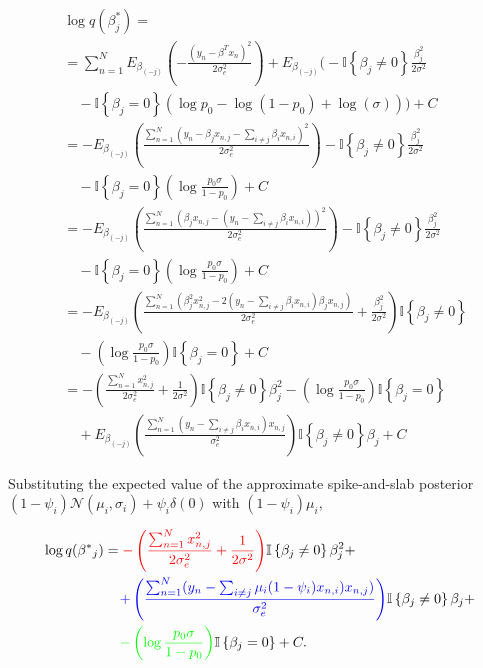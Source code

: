 \begin{align}
    &\log q(\beta^{*}_j) = \nonumber \\
    &= \sum_{n=1}^N E_{\beta_{(-j)}} \left( - \frac{(y_n - \beta^T x_n)^2}{2 \sigma_e^2} \right) + E_{\beta_{(-j)}} \bigg( - \mathbb{I}\left\{\beta_j \ne 0\right\} \frac{\beta_j^2}{2\sigma^2} \nonumber \\
    &\quad - \mathbb{I}\left\{\beta_j = 0\right\} \left(\log p_0 - \log (1-p_0) + \log(\sigma) \right)\bigg) + C \nonumber \\
    &= - E_{\beta_{(-j)}} \left( \frac{\sum_{n=1}^N (y_n - \beta_j x_{n,j} - \sum_{i \ne j} \beta_i x_{n,i})^2}{2 \sigma_e^2} \right)  - \mathbb{I}\left\{\beta_j \ne 0\right\} \frac{\beta_j^2}{2\sigma^2} \nonumber \\
    &\quad - \mathbb{I}\left\{\beta_j = 0\right\} \left(\log \frac{p_0 \sigma}{1-p_0} \right) + C \nonumber \\
    &= - E_{\beta_{(-j)}} \left( \frac{\sum_{n=1}^N (\beta_j x_{n,j} - (y_n - \sum_{i \ne j} \beta_i x_{n,i}))^2}{2 \sigma_e^2} \right)  - \mathbb{I}\left\{\beta_j \ne 0\right\} \frac{\beta_j^2}{2\sigma^2} \nonumber \\
    &\quad - \mathbb{I}\left\{\beta_j = 0\right\} \left(\log \frac{p_0 \sigma}{1-p_0} \right) + C \nonumber \\
    &= - E_{\beta_{(-j)}} \left( \frac{\sum_{n=1}^N (\beta^2_j x^2_{n,j} - 2(y_n - \sum_{i \ne j} \beta_i x_{n,i})\beta_j x_{n,j})}{2 \sigma_e^2} + \frac{\beta_j^2}{2\sigma^2} \right) \mathbb{I}\left\{\beta_j \ne 0\right\} \nonumber \\
    &\quad - \left(\log \frac{p_0 \sigma}{1-p_0} \right)\mathbb{I}\left\{\beta_j = 0\right\} + C \nonumber \\
    &= - \left( \frac{\sum_{n=1}^N x^2_{n,j}}{2 \sigma_e^2} + \frac{1}{2\sigma^2} \right)\mathbb{I}\left\{\beta_j \ne 0\right\}\beta_j^2  - \left(\log \frac{p_0 \sigma}{1-p_0} \right)\mathbb{I}\left\{\beta_j = 0\right\} \nonumber \\
    &\quad + E_{\beta_{(-j)}} \left( \frac{\sum_{n=1}^N (y_n - \sum_{i \ne j} \beta_i x_{n,i}) x_{n,j}}{\sigma_e^2} \right)\mathbb{I}\left\{\beta_j \ne 0\right\}\beta_j  + C
\end{align}

%
Substituting the expected value of the approximate spike-and-slab posterior $(1-\psi_i)\mathcal{N}(\mu_i, \sigma_i) + \psi_i \delta(0)$ with $(1-\psi_i)\mu_i$,

\begin{align}
   \log q(\beta^{*}{_j}) &=  {\color{red}{- \left( \frac{\sum_{n=1}^N x^2_{n,j}}{2 \sigma_e^2} + \frac{1}{2\sigma^2} \right)}}\mathbb{I}\left\{\beta_j \ne 0\right\}\beta_j^2 \nonumber +\\ & \hspace{4mm} {\color{blue}{+ \left( \frac{\sum_{n=1}^N (y_n - \sum_{i \ne j} \mu_i (1- \psi_i) x_{n,i}) x_{n,j})}{ \sigma_e^2} \right)}}\mathbb{I}\left\{\beta_j \ne 0\right\}\beta_j \nonumber +\\ & \hspace{4mm} {\color{green}{- \left(\log \frac{p_0 \sigma}{1-p_0} \right)}}\mathbb{I}\left\{\beta_j = 0\right\} + C.
\end{align}


